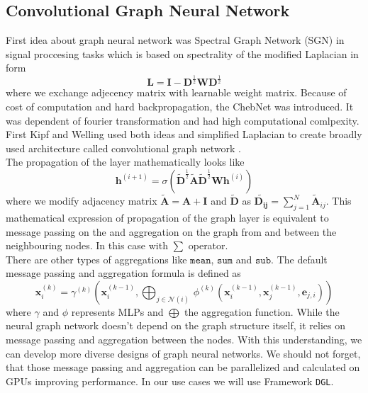 \subsection{Convolutional Graph Neural Network}
First idea about graph neural network was Spectral Graph Network (SGN) \cite{sgn} in signal proccesing tasks which is based on spectrality of the modified  Laplacian in form \begin{equation}
	\mathbf{L}= \mathbf{I} - \mathbf{D}^{\frac{1}{2}}\mathbf{W}\mathbf{D}^{\frac{1}{2}} 
\end{equation}where we exchange adjecency matrix with learnable weight matrix.
Because of cost of computation and hard backpropagation, the ChebNet was introduced\cite{cheb}. 
It was dependent of fourier transformation and had high computational comlpexity.
First Kipf and Welling used both ideas and simplified Laplacian to create broadly used architecture called convolutional graph network \cite{gcn}. \\
The propagation of the layer mathematically looks like
\begin{equation}
	\mathbf{h}^{(i+1)}=\sigma(\tilde{\mathbf{D}}^{\frac{1}{2}}\tilde{\mathbf{A}}\tilde{\mathbf{D}}^{\frac{1}{2}}\mathbf{W}\mathbf{h}^{(i)})
\end{equation} where we modify adjacency matrix $\tilde{\mathbf{A}}=\mathbf{A}+ \mathbf{I}$ and $\tilde{\mathbf{D}}$ as $\tilde{\mathbf{D_{ij}}} =\sum_{j=1}^N \tilde{\mathbf{A}}_{ij}.$ 
This mathematical expression of propagation of the graph layer is equivalent to message passing on the  and aggregation on the graph from and between the neighbouring nodes. In this case with $\sum$ operator.\\ There are other types of aggregations like $\texttt{mean}$, $\texttt{sum}$ and $\texttt{sub}$. 
The default message passing and aggregation formula is defined as
\begin{equation}
\mathbf{x}_i^{(k)} = \gamma^{(k)} \left( \mathbf{x}_i^{(k-1)}, \bigoplus_{j \in \mathcal{N}(i)} \, \phi^{(k)}\left(\mathbf{x}_i^{(k-1)}, \mathbf{x}_j^{(k-1)},\mathbf{e}_{j,i}\right) \right) 
\end{equation} where $\gamma$ and $\phi$ represents MLPs and $\bigoplus$ the aggregation function. 
While the neural graph network doesn't depend on the graph structure itself, it relies on message passing and aggregation between the nodes. With this understanding, we can develop more diverse designs of graph neural networks. 
We should not forget, that those message passing and aggregation can be parallelized and calculated on GPUs improving performance. In our use cases we will use Framework \texttt{DGL}\cite{dgl}.


